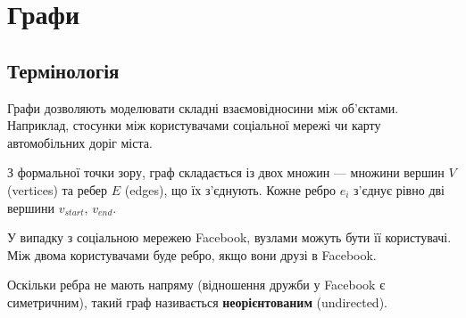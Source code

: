 \documentclass[12pt,a4paper]{report}
\begin{document}
\chapter{Графи}

\begingroup
\let\clearpage\relax
\tableofcontents
\endgroup



\section{Термінологія}

Графи дозволяють моделювати складні взаємовідносини між об’єктами. Наприклад, стосунки між користувачами соціальної мережі чи карту автомобільних доріг міста.

З формальної точки зору, граф складається із двох множин --- множини вершин \(V\) (vertices) та ребер \(E\) (edges), що їх з’єднують. Кожне ребро \(e_i\) з’єднує рівно дві вершини \(v_{start}\), \(v_{end}\).

У випадку з соціальною мережею Facebook, вузлами можуть бути її користувачі. Між двома користувачами буде ребро, якщо вони друзі в Facebook.

\begin{center}
\end{center}

Оскільки ребра не мають напряму (відношення дружби у Facebook є симетричним), такий граф називається \textbf{неорієнтованим} (undirected).
\end{document}
